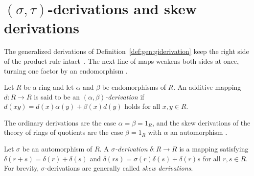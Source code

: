 \section{$(\sigma,\tau)$-derivations and skew derivations}\label{sec:generalized-twisted:sigma-tau}

The generalized derivations of Definition~\ref{def:gen:giderivation} keep
the right side of the product rule intact~\cite[p.~892]{Huang2018}. The next line of maps weakens
both sides at once, turning one factor by an endomorphism
\cite[p.~892]{Huang2018}.

\begin{definition}\label{def:gen:alphabeta}
Let $R$ be a ring and let $\alpha$ and $\beta$ be endomorphisms of $R$. An
additive mapping $d\colon R\to R$ is said to be an
\emph{$(\alpha,\beta)$-derivation} if $d(xy)=d(x)\alpha(y)+\beta(x)d(y)$
holds for all $x,y\in R$.
\end{definition}

The ordinary derivations are the case $\alpha=\beta=1_{R}$, and the skew
derivations of the theory of rings of quotients are the case $\beta=1_{R}$
with $\alpha$ an automorphism \cite[p.~260]{ChouLiu2009}.

\begin{definition}\label{def:gen:sigma}
Let $\sigma$ be an automorphism of $R$. A \emph{$\sigma$-derivation}
$\delta\colon R\to R$ is a mapping satisfying $\delta(r+s)=\delta(r)+\delta(s)$
and $\delta(rs)=\sigma(r)\delta(s)+\delta(r)s$ for all $r,s\in R$. For
brevity, $\sigma$-derivations are generally called \emph{skew derivations}.
\end{definition}

